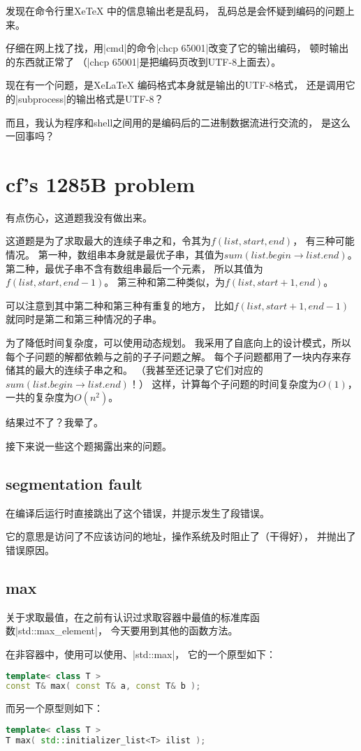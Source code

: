 发现在命令行里XeTeX 中的信息输出老是乱码，
乱码总是会怀疑到编码的问题上来。

仔细在网上找了找，用\vb|cmd|的命令\vb|chcp 65001|改变了它的输出编码，
顿时输出的东西就正常了
（\vb|chcp 65001|是把编码页改到UTF-8上面去）。

现在有一个问题，是XeLaTeX 编码格式本身就是输出的UTF-8格式，
还是调用它的\vb|subprocess|的输出格式是UTF-8？

而且，我认为程序和shell之间用的是编码后的二进制数据流进行交流的，
是这么一回事吗？


\section{cf's 1285B problem}

有点伤心，这道题我没有做出来。

这道题是为了求取最大的连续子串之和，令其为$f(list, start, end)$，
有三种可能情况。
第一种，数组串本身就是最优子串，其值为$sum(list.begin\to list.end)$。
第二种，最优子串不含有数组串最后一个元素，
所以其值为$f(list, start, end-1)$。
第三种和第二种类似，为$f(list, start+1, end)$。

可以注意到其中第二种和第三种有重复的地方，
比如$f(list, start+1, end-1)$就同时是第二和第三种情况的子串。

为了降低时间复杂度，可以使用动态规划。
我采用了自底向上的设计模式，所以每个子问题的解都依赖与之前的子子问题之解。
每个子问题都用了一块内存来存储其的最大的连续子串之和。
（我甚至还记录了它们对应的$sum(list.begin\to list.end)$！）
这样，计算每个子问题的时间复杂度为$O(1)$，
一共的复杂度为$O(n^2)$。

结果过不了？我晕了。

接下来说一些这个题揭露出来的问题。

\subsection{segmentation fault}
在编译后运行时直接跳出了这个错误，并提示发生了段错误。

它的意思是访问了不应该访问的地址，操作系统及时阻止了（干得好），
并抛出了错误原因。

\subsection{max}
关于求取最值，在之前有认识过求取容器中最值的标准库函数\vb|std::max_element|，
今天要用到其他的函数方法。

在非容器中，使用可以使用、\vb|std::max|，
它的一个原型如下：
\begin{lstlisting}[language=C++]
template< class T >
const T& max( const T& a, const T& b );
\end{lstlisting}
而另一个原型则如下：
\begin{lstlisting}[language=C++]
template< class T >
T max( std::initializer_list<T> ilist );
\end{lstlisting}

